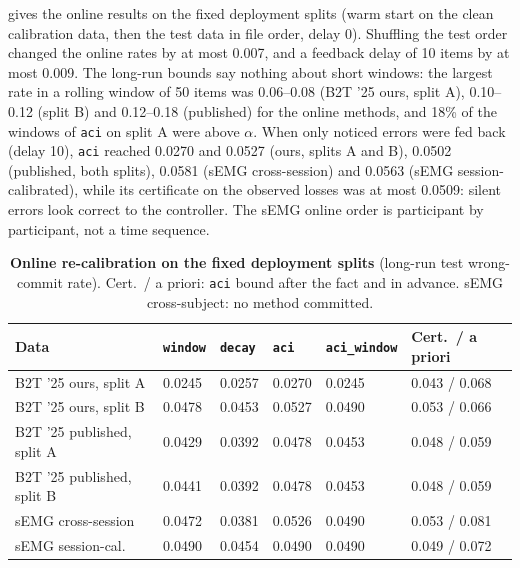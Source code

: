  gives the online results on the fixed deployment splits (warm start on the clean calibration data, then the test data in file order, delay 0). Shuffling the test order changed the online rates by at most 0.007, and a feedback delay of 10 items by at most 0.009. The long-run bounds say nothing about short windows: the largest rate in a rolling window of 50 items was 0.06--0.08 (B2T '25 ours, split A), 0.10--0.12 (split B) and 0.12--0.18 (published) for the online methods, and 18\% of the windows of \texttt{aci} on split A were above $\alpha$. When only noticed errors were fed back (delay 10), \texttt{aci} reached 0.0270 and 0.0527 (ours, splits A and B), 0.0502 (published, both splits), 0.0581 (sEMG cross-session) and 0.0563 (sEMG session-calibrated), while its certificate on the observed losses was at most 0.0509: silent errors look correct to the controller. The sEMG online order is participant by participant, not a time sequence.

\begin{table}[H]
  \centering
  \caption{\textbf{Online re-calibration on the fixed deployment splits} (long-run test wrong-commit rate). Cert.\ / a priori: \texttt{aci} bound after the fact and in advance. sEMG cross-subject: no method committed.}
  \label{tab:online-results}
  \small
  \begin{tabular}{@{}llllll@{}}
    \toprule
    \textbf{Data} & \texttt{window} & \texttt{decay} & \texttt{aci} & \texttt{aci\_window} & \textbf{Cert.\ / a priori} \\
    \midrule
    B2T '25 ours, split A & 0.0245 & 0.0257 & 0.0270 & 0.0245 & 0.043 / 0.068 \\
    B2T '25 ours, split B & 0.0478 & 0.0453 & 0.0527 & 0.0490 & 0.053 / 0.066 \\
    B2T '25 published, split A & 0.0429 & 0.0392 & 0.0478 & 0.0453 & 0.048 / 0.059 \\
    B2T '25 published, split B & 0.0441 & 0.0392 & 0.0478 & 0.0453 & 0.048 / 0.059 \\
    sEMG cross-session & 0.0472 & 0.0381 & 0.0526 & 0.0490 & 0.053 / 0.081 \\
    sEMG session-cal. & 0.0490 & 0.0454 & 0.0490 & 0.0490 & 0.049 / 0.072 \\
    \bottomrule
  \end{tabular}
\end{table}

